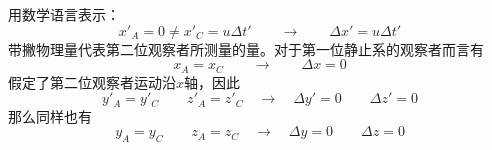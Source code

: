 用数学语言表示：
\begin{equation}\label{equ2.2}
  x'_A=0 \neq x'_C=u \Delta t' \qquad \rightarrow \qquad \Delta x' =u \Delta t'
\end{equation}
带撇物理量代表第二位观察者所测量的量。对于第一位静止系的观察者而言有
\begin{equation}\label{equ2.3}
  x_A=x_C \qquad \rightarrow \qquad \Delta x=0
\end{equation}
假定了第二位观察者运动沿$x$轴，因此
\begin{equation}\label{equ2.4}
 y'_A=y'_C \quad  \quad z'_A=z'_C \quad \rightarrow \quad \Delta y'=0 \quad  \quad \Delta z'=0
\end{equation}
那么同样也有
\begin{equation}\label{equ2.5}
 y_A=y_C \quad  \quad z_A=z_C \quad \rightarrow \quad \Delta y=0 \quad  \quad \Delta z=0
\end{equation}

